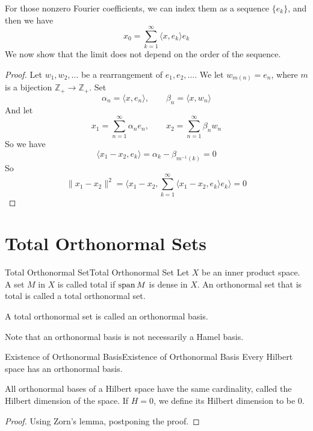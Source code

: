 \documentclass[../main.tex]{subfiles}
\begin{document}
For those nonzero Fourier coefficients, we can index them as a sequence $\{e_k\}$, and then we have
\begin{equation*}
	x_0 = \sum_{k=1}^\infty \langle x, e_k \rangle e_k
\end{equation*}
We now show that the limit does not depend on the order of the sequence.
\begin{proof}
	Let $w_1,w_2, \ldots $ be a rearrangement of $e_1, e_2, \ldots$. We let $w_{m(n)} = e_n$, where $m$ is a bijection $\mathbb{Z}_+ \rightarrow \mathbb{Z}_+$. Set
	\begin{equation*}
		\alpha_n = \langle x, e_n \rangle, \qquad \beta_n = \langle x, w_n \rangle
	\end{equation*}
	And let
	\begin{equation*}
		x_1 = \sum_{n=1}^\infty \alpha_n e_n, \qquad x_2 = \sum_{n=1}^\infty \beta_n w_n
	\end{equation*}
	So we have
	\begin{equation*}
		\langle x_1 - x_2, e_k \rangle = \alpha_k - \beta_{m^{-1}(k)} = 0
	\end{equation*}
	So
	\begin{equation*}
		\|x_1 - x_2\|^2 = \langle x_1-x_2, \sum_{k=1}^\infty \langle x_1 - x_2, e_k \rangle e_k \rangle = 0
	\end{equation*}
\end{proof}

\section{Total Orthonormal Sets}

\begin{definition}{Total Orthonormal Set}{Total Orthonormal Set}
	Let $X$ be an inner product space. A set $M$ in $X$ is called total if $\operatorname{span} M$ is dense in $X$. An orthonormal set that is total is called a total orthonormal set.

	A total orthonormal set is called an orthonormal basis.
\end{definition}
\begin{remark}
	Note that an orthonormal basis is not necessarily a Hamel basis.
\end{remark}

\begin{theorem}{Existence of Orthonormal Basis}{Existence of Orthonormal Basis}
	Every Hilbert space has an orthonormal basis.

	All orthonormal bases of a Hilbert space have the same cardinality, called the Hilbert dimension of the space. If $H=0$, we define its Hilbert dimension to be 0.
\end{theorem}
\begin{proof}
Using Zorn's lemma, postponing the proof.
\end{proof}
\end{document}
